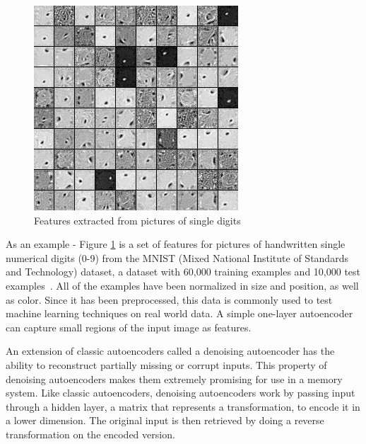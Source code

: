 \documentclass{sig-alternate}
\begin{document}
\begin{figure}[h]
	\begin{center}
		\includegraphics[width=0.75\linewidth]{filters_corruption_30.png}
	\end{center}
	\vspace{-12pt}
	\caption{Features extracted from pictures of single digits}
	\label{fig:features}
\end{figure}

As an example - Figure \ref{fig:features} is a set of features for pictures of handwritten single 
numerical digits (0-9) from the MNIST (Mixed National Institute of Standards and Technology) dataset, 
a dataset with 60,000 training examples and 10,000 test examples~\cite{denoise}. 
All of the examples have been normalized in size and position, as well as 
color. Since it has been preprocessed, this data is commonly used to test machine learning 
techniques on real world data.  A simple one-layer autoencoder can capture small regions of the input image as features. 

An extension of classic autoencoders called a denoising autoencoder has the ability to reconstruct 
partially missing or corrupt inputs. This property of denoising autoencoders makes them extremely 
promising for use in a memory system. Like classic autoencoders, 
denoising autoencoders work by passing input through a hidden 
layer, a matrix that represents a transformation, to encode it in a lower dimension. The original 
input is then retrieved by doing a reverse transformation on the encoded version.~\cite{denoise}
\end{document}
